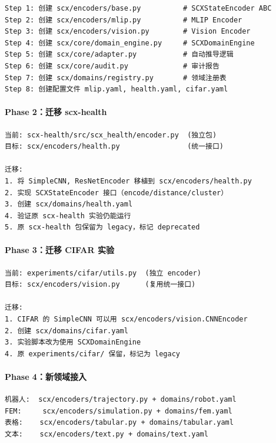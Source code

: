 \documentclass[
  12pt,
]{ctexart}
\begin{document}
\begin{verbatim}
Step 1: 创建 scx/encoders/base.py          # SCXStateEncoder ABC
Step 2: 创建 scx/encoders/mlip.py          # MLIP Encoder
Step 3: 创建 scx/encoders/vision.py        # Vision Encoder
Step 4: 创建 scx/core/domain_engine.py     # SCXDomainEngine
Step 5: 创建 scx/core/adapter.py           # 自动推导逻辑
Step 6: 创建 scx/core/audit.py             # 审计报告
Step 7: 创建 scx/domains/registry.py       # 领域注册表
Step 8: 创建配置文件 mlip.yaml, health.yaml, cifar.yaml
\end{verbatim}

\paragraph{Phase 2：迁移
scx-health}\label{phase-2ux8fc1ux79fb-scx-health}

\begin{verbatim}
当前: scx-health/src/scx_health/encoder.py  (独立包)
目标: scx/encoders/health.py                (统一接口)

迁移:
1. 将 SimpleCNN, ResNetEncoder 移植到 scx/encoders/health.py
2. 实现 SCXStateEncoder 接口（encode/distance/cluster）
3. 创建 scx/domains/health.yaml
4. 验证原 scx-health 实验仍能运行
5. 原 scx-health 包保留为 legacy，标记 deprecated
\end{verbatim}

\paragraph{Phase 3：迁移 CIFAR
实验}\label{phase-3ux8fc1ux79fb-cifar-ux5b9eux9a8c}

\begin{verbatim}
当前: experiments/cifar/utils.py  (独立 encoder)
目标: scx/encoders/vision.py      (复用统一接口)

迁移:
1. CIFAR 的 SimpleCNN 可以用 scx/encoders/vision.CNNEncoder
2. 创建 scx/domains/cifar.yaml
3. 实验脚本改为使用 SCXDomainEngine
4. 原 experiments/cifar/ 保留，标记为 legacy
\end{verbatim}

\paragraph{Phase
4：新领域接入}\label{phase-4ux65b0ux9886ux57dfux63a5ux5165}

\begin{verbatim}
机器人:  scx/encoders/trajectory.py + domains/robot.yaml
FEM:     scx/encoders/simulation.py + domains/fem.yaml
表格:    scx/encoders/tabular.py + domains/tabular.yaml
文本:    scx/encoders/text.py + domains/text.yaml
\end{verbatim}
\end{document}
